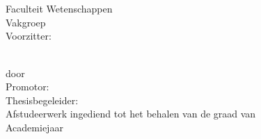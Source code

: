 \begin{titlepage}
\renewcommand{\baselinestretch}{1.1}
\Large
\begin{center}
\mbox{}\\[0cm]%
\unitlength 1mm

\epsfysize 4cm \epsfclipon{}\\
{\Large  
Faculteit Wetenschappen\\
Vakgroep \vakgroep\\
Voorzitter: \voorzitter
}\\\vfill
\parbox{14 cm}{
{\huge\bfseries
\begin{center}
\sf\titel
\end{center}
}
}\\\vfill
door \auteur\\[3.3cm]
Promotor: \promotor \\
Thesisbegeleider: \begeleider 
\\\vfill
Afstudeerwerk ingediend tot het behalen van de graad van
\richting\\[1cm]
Academiejaar \jaar
\end{center}
\renewcommand{\baselinestretch}{1}
\end{titlepage}






